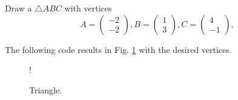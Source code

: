 \documentclass[journal,12pt,twocolumn]{IEEEtran}
\begin{document}
\begin{problem}
\label{prob:traingle_def}
Draw a $\triangle ABC$ with vertices 
\begin{equation}
A =
\begin{pmatrix}
-2
\\
-2
\end{pmatrix},
B =
\begin{pmatrix}
1
\\
3
\end{pmatrix},
C =
\begin{pmatrix}
4
\\
-1
\end{pmatrix},
\end{equation}

\end{problem}
\solution The following code results in Fig. \ref{fig:triangle_def} with the desired vertices.

\begin{figure}[!h]
\centering
\resizebox {\columnwidth} {!} {

}
\caption{Triangle.}
\label{fig:triangle_def}
\end{figure}
\end{document}

